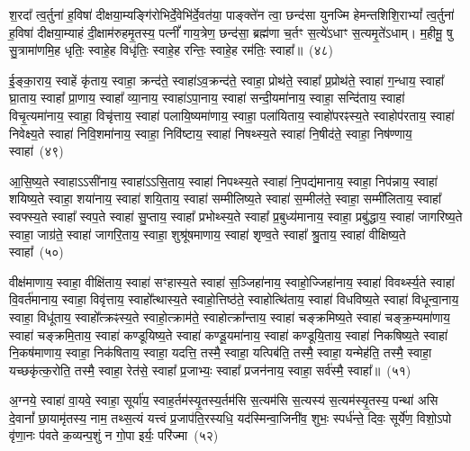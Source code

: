 श॒रदा᳚ त्व॒र्तुना॑ ह॒विषा॑ दीक्षया॒म्यङ्गि॑रोभिर्दे॒वेभि॑र्दे॒वत॑या॒ पाङ्क्ते॑न त्वा॒ छन्द॑सा युनज्मि हेमन्तशिशि॒रा\-भ्यां᳚ त्व॒र्तुना॑ ह॒विषा॑ दीक्षया॒म्याहं दी॒क्षाम॑रुहमृ॒तस्य॒ पत्नीं᳚ गाय॒त्रेण॒ छन्द॑सा॒ ब्रह्म॑णा च॒र्तꣳ स॒त्ये॑\-ऽधाꣳ स॒त्यमृ॒ते॑\-ऽधाम्। म॒हीमू॒ षु सु॒त्रामा॑णमि॒ह धृतिः॒ स्वाहे॒ह विधृ॑तिः॒ स्वाहे॒ह रन्तिः॒ स्वाहे॒ह रम॑तिः॒ स्वाहा᳚॥~(४८)

{\anuvakamend[{}]}

ई॒ङ्का॒राय॒ स्वाहें कृ॑ताय॒ स्वाहा॒ क्रन्द॑ते॒ स्वाहा॑\-ऽव॒क्रन्द॑ते॒ स्वाहा॒ प्रोथ॑ते॒ स्वाहा᳚ प्र॒प्रोथ॑ते॒ स्वाहा॑ ग॒न्धाय॒ स्वाहा᳚ घ्रा॒ताय॒ स्वाहा᳚ प्रा॒णाय॒ स्वाहा᳚ व्या॒नाय॒ स्वाहा॑\-ऽपा॒नाय॒ स्वाहा॑ सन्दी॒यमा॑नाय॒ स्वाहा॒ सन्दि॑ताय॒ स्वाहा॑ विचृ॒त्यमा॑नाय॒ स्वाहा॒ विचृ॑त्ताय॒ स्वाहा॑ पलायि॒ष्यमा॑णाय॒ स्वाहा॒ पला॑यिताय॒ स्वाहो॑परꣴस्य॒ते स्वाहोप॑रताय॒ स्वाहा॑ निवेक्ष्य॒ते स्वाहा॑ निवि॒शमा॑नाय॒ स्वाहा॒ निवि॑ष्टाय॒ स्वाहा॑ निषथ्स्य॒ते स्वाहा॑ नि॒षीद॑ते॒ स्वाहा॒ निष॑ण्णाय॒ स्वाहा॑~(४९)



आ॒सि॒ष्य॒ते स्वाहा\-ऽऽ\-सी॑नाय॒ स्वाहा॑\-ऽऽ\-सि॒ताय॒ स्वाहा॑ निपथ्स्य॒ते स्वाहा॑ नि॒पद्य॑मानाय॒ स्वाहा॒ निप॑न्नाय॒ स्वाहा॑ शयिष्य॒ते स्वाहा॒ शया॑नाय॒ स्वाहा॑ शयि॒ताय॒ स्वाहा॑ सम्मीलिष्य॒ते स्वाहा॑ स॒म्मील॑ते॒ स्वाहा॒ सम्मी॑लिताय॒ स्वाहा᳚ स्वफ्स्य॒ते स्वाहा᳚ स्वप॒ते स्वाहा॑ सु॒प्ताय॒ स्वाहा᳚ प्रभोथ्स्य॒ते स्वाहा᳚ प्र॒बुध्य॑मानाय॒ स्वाहा॒ प्रबु॑द्धाय॒ स्वाहा॑ जागरिष्य॒ते स्वाहा॒ जाग्र॑ते॒ स्वाहा॑ जागरि॒ताय॒ स्वाहा॒ शुश्रू॑षमाणाय॒ स्वाहा॑ शृण्व॒ते स्वाहा᳚ श्रु॒ताय॒ स्वाहा॑ वीक्षिष्य॒ते स्वाहा᳚~(५०)

वीक्ष॑माणाय॒ स्वाहा॒ वीक्षि॑ताय॒ स्वाहा॑ सꣳहास्य॒ते स्वाहा॑ स॒ञ्जिहा॑नाय॒ स्वाहो॒ज्जिहा॑नाय॒ स्वाहा॑ विवर्थ्स्य॒ते स्वाहा॑ वि॒वर्त॑मानाय॒ स्वाहा॒ विवृ॑त्ताय॒ स्वाहो᳚त्थास्य॒ते स्वाहो॒त्तिष्ठ॑ते॒ स्वाहोत्थि॑ताय॒ स्वाहा॑ विधविष्य॒ते स्वाहा॑ विधून्वा॒नाय॒ स्वाहा॒ विधू॑ताय॒ स्वाहो᳚त्क्रꣴस्य॒ते स्वाहो॒त्क्राम॑ते॒ स्वाहोत्क्रा᳚न्ताय॒ स्वाहा॑ चङ्क्रमिष्य॒ते स्वाहा॑ चङ्क्र॒म्यमा॑णाय॒ स्वाहा॑ चङ्क्रमि॒ताय॒ स्वाहा॑ कण्डूयिष्य॒ते स्वाहा॑ कण्डू॒यमा॑नाय॒ स्वाहा॑ कण्डूयि॒ताय॒ स्वाहा॑ निकषिष्य॒ते स्वाहा॑ नि॒कष॑माणाय॒ स्वाहा॒ निक॑षिताय॒ स्वाहा॒ यदत्ति॒ तस्मै॒ स्वाहा॒ यत्पिब॑ति॒ तस्मै॒ स्वाहा॒ यन्मेह॑ति॒ तस्मै॒ स्वाहा॒ यच्छकृ॑त्क॒रोति॒ तस्मै॒ स्वाहा॒ रेत॑से॒ स्वाहा᳚ प्र॒जाभ्यः॒ स्वाहा᳚ प्रजन॑नाय॒ स्वाहा॒ सर्व॑स्मै॒ स्वाहा᳚॥~(५१)

{\anuvakamend[{}]}

अ॒ग्नये॒ स्वाहा॑ वा॒यवे॒ स्वाहा॒ सूर्या॑य॒ स्वाह॒र्तम॑स्यृ॒तस्य॒र्तम॑सि स॒त्यम॑सि स॒त्यस्य॑ स॒त्यम॑स्यृ॒तस्य॒ पन्था॑ असि दे॒वानां᳚ छा॒यामृ॑तस्य॒ नाम॒ तथ्स॒त्यं यत्त्वं प्र॒जा\-प॑ति॒रस्यधि॒ यद॑स्मिन्वा॒जिनी॑व॒ शुभः॒ स्पर्ध॑न्ते॒ दिवः॒ सूर्ये॑ण॒ विशो॒\-ऽपो वृ॑णा॒नः प॑वते क॒व्यन्प॒शुं न गो॒पा इर्यः॒ परि॑ज्मा~(५२)


